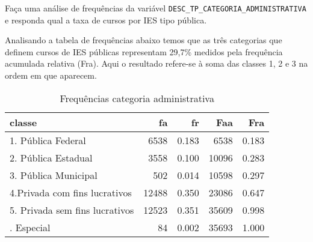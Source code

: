 \documentclass[11pt,]{style/krantz}
\makeatletter
\newenvironment{Shaded}{\begin{snugshade}}{\end{snugshade}}
\newcommand{\DataTypeTok}[1]{\textcolor[rgb]{0.13,0.29,0.53}{#1}}
\newcommand{\DecValTok}[1]{\textcolor[rgb]{0.00,0.00,0.81}{#1}}
\newcommand{\KeywordTok}[1]{\textcolor[rgb]{0.13,0.29,0.53}{\textbf{#1}}}
\newcommand{\NormalTok}[1]{#1}
\newcommand{\OperatorTok}[1]{\textcolor[rgb]{0.81,0.36,0.00}{\textbf{#1}}}
\newcommand{\OtherTok}[1]{\textcolor[rgb]{0.56,0.35,0.01}{#1}}
\newcommand{\StringTok}[1]{\textcolor[rgb]{0.31,0.60,0.02}{#1}}
\newenvironment{kframe}{%
\medskip{}
\setlength{\fboxsep}{.8em}
 \def\at@end@of@kframe{}%
 \ifinner\ifhmode%
  \def\at@end@of@kframe{\end{minipage}}%
  \begin{minipage}{\columnwidth}%
 \fi\fi%
 \def\FrameCommand##1{\hskip\@totalleftmargin \hskip-\fboxsep
 \colorbox{shadecolor}{##1}\hskip-\fboxsep
     \hskip-\linewidth \hskip-\@totalleftmargin \hskip\columnwidth}%
 \MakeFramed {\advance\hsize-\width
   \@totalleftmargin\z@ \linewidth\hsize
   \@setminipage}}%
 {\par\unskip\endMakeFramed%
 \at@end@of@kframe}
\renewenvironment{Shaded}{\begin{kframe}}{\end{kframe}}
\theoremstyle{definition}
\theoremstyle{definition}
\theoremstyle{definition}
\theoremstyle{remark}
\let\BeginKnitrBlock\begin \let\EndKnitrBlock\end
\makeatother
\begin{document}
\BeginKnitrBlock{exercise}
\protect\hypertarget{exr:unnamed-chunk-35}{}{\label{exr:unnamed-chunk-35} }Faça uma análise de frequências da variável \texttt{DESC\_TP\_CATEGORIA\_ADMINISTRATIVA} e responda qual a taxa de cursos por IES tipo pública.
\EndKnitrBlock{exercise}

\BeginKnitrBlock{solution}
\iffalse{} {Solução. } \fi{}Analisando a tabela de frequências abaixo temos que as três categorias que definem cursos de IES públicas representam 29,7\% medidos pela frequência acumulada relativa (Fra). Aqui o resultado refere-se à soma das classes 1, 2 e 3 na ordem em que aparecem.
\EndKnitrBlock{solution}

\begin{Shaded}
\end{Shaded}

\begin{table}[!h]

\caption{\label{tab:unnamed-chunk-37}Frequências categoria administrativa}
\centering
\begin{tabular}{lrrrr}
\toprule
classe & fa & fr & Faa & Fra\\
\midrule
1. Pública Federal & 6538 & 0.183 & 6538 & 0.183\\
2. Pública Estadual & 3558 & 0.100 & 10096 & 0.283\\
3. Pública Municipal & 502 & 0.014 & 10598 & 0.297\\
4.Privada com fins lucrativos & 12488 & 0.350 & 23086 & 0.647\\
5. Privada sem fins lucrativos & 12523 & 0.351 & 35609 & 0.998\\
\addlinespace
7. Especial & 84 & 0.002 & 35693 & 1.000\\
\bottomrule
\end{tabular}
\end{table}
\end{document}
